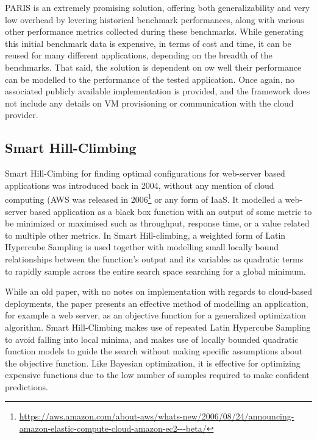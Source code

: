 \documentclass{report}
\begin{document}
PARIS is an extremely promising solution, offering both generalizability and very low overhead by levering historical benchmark performances, along with various other performance metrics collected during these benchmarks. While generating this initial benchmark data is expensive, in terms of cost and time, it can be reused for many different applications, depending on the breadth of the benchmarks. That said, the solution is dependent on ow well their performance can be modelled to the performance of the tested application. Once again, no associated publicly available implementation is provided, and the framework does not include any details on VM provisioning or communication with the cloud provider.

\subsection{Smart Hill-Climbing}
Smart Hill-Cimbing for finding optimal configurations for web-server based applications was introduced back in 2004\cite{Xi2004}, without any mention of cloud computing (AWS was released in 2006\footnote{\url{https://aws.amazon.com/about-aws/whats-new/2006/08/24/announcing-amazon-elastic-compute-cloud-amazon-ec2---beta/}} or any form of IaaS. It modelled a web-server based application as a black box function with an output of some metric to be minimized or maximised such as throughput, response time, or a value related to multiple other metrics. In Smart Hill-climbing, a weighted form of Latin Hypercube Sampling\cite{McKay2000} is used together with modelling small locally bound relationships between the function's output and its variables as quadratic terms to rapidly sample across the entire search space searching for a global minimum.

While an old paper, with no notes on implementation with regards to cloud-based deployments, the paper presents an effective method of modelling an application, for example a web server, as an objective function for a generalized optimization algorithm. Smart Hill-Climbing makes use of repeated Latin Hypercube Sampling to avoid falling into local minima, and makes use of locally bounded quadratic function models to guide the search without making specific assumptions about the objective function. Like Bayesian optimization, it is effective for optimizing expensive functions due to the low number of samples required to make confident predictions. 
\end{document}

